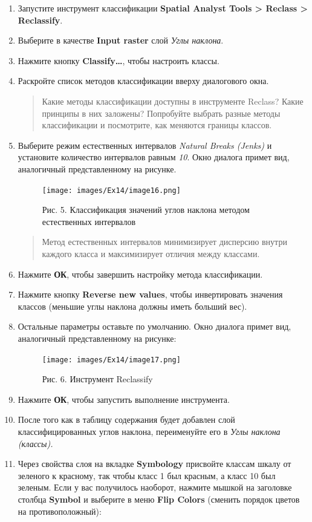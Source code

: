 \documentclass[12pt,]{book}
\begin{document}
\begin{enumerate}
\def\labelenumi{\arabic{enumi}.}
\item
  Запустите инструмент классификации \textbf{Spatial Analyst Tools \textgreater{} Reclass \textgreater{} Reclassify}.
\item
  Выберите в качестве \textbf{Input raster} слой \emph{Углы наклона}.
\item
  Нажмите кнопку \textbf{Classify\ldots{}}, чтобы настроить классы.
\item
  Раскройте список методов классификации вверху диалогового окна.

  \begin{quote}
  Какие методы классификации доступны в инструменте Reclass? Какие принципы в них заложены? Попробуйте выбрать разные методы классификации и посмотрите, как меняются границы классов.
  \end{quote}
\item
  Выберите режим естественных интервалов \emph{Natural Breaks (Jenks)} и установите количество интервалов равным \emph{10}. Окно диалога примет вид, аналогичный представленному на рисунке.

  \begin{figure}
  \centering
  \texttt{[image: images/Ex14/image16.png]}
  \caption{Рис. 5. Классификация значений углов наклона методом естественных интервалов}
  \end{figure}

  \begin{quote}
  Метод естественных интервалов минимизирует дисперсию внутри каждого класса и максимизирует отличия между классами.
  \end{quote}
\item
  Нажмите \textbf{ОК}, чтобы завершить настройку метода классификации.
\item
  Нажмите кнопку \textbf{Reverse new values}, чтобы инвертировать значения классов (меньшие углы наклона должны иметь больший вес).
\item
  Остальные параметры оставьте по умолчанию. Окно диалога примет вид, аналогичный представленному на рисунке:

  \begin{figure}
  \centering
  \texttt{[image: images/Ex14/image17.png]}
  \caption{Рис. 6. Инструмент Reclassify}
  \end{figure}
\item
  Нажмите \textbf{ОК}, чтобы запустить выполнение инструмента.
\item
  После того как в таблицу содержания будет добавлен слой классифицированных углов наклона, переименуйте его в \emph{Углы наклона (классы).}
\item
  Через свойства слоя на вкладке \textbf{Symbology} присвойте классам шкалу от зеленого к красному, так чтобы класс 1 был красным, а класс 10 был зеленым. Если у вас получилось наоборот, нажмите мышкой на заголовке столбца \textbf{Symbol} и выберите в меню \textbf{Flip Colors} (сменить порядок цветов на противоположный):


\end{enumerate}
\end{document}
